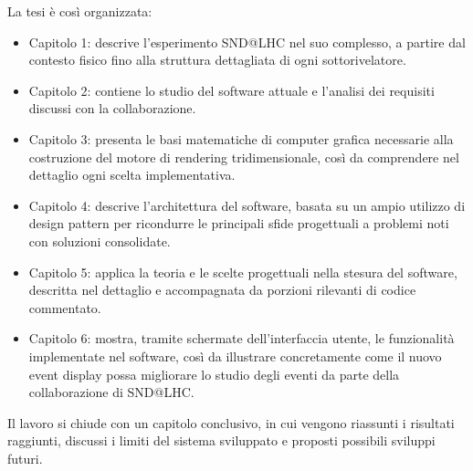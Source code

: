 La tesi è così organizzata:
\begin{itemize}
    \item Capitolo 1: descrive l'esperimento SND@LHC nel suo complesso, a partire dal contesto fisico fino alla struttura dettagliata di ogni sottorivelatore.
    \item Capitolo 2: contiene lo studio del software attuale e l'analisi dei requisiti discussi con la collaborazione.
    \item Capitolo 3: presenta le basi matematiche di computer grafica necessarie alla costruzione del motore di rendering tridimensionale, così da comprendere nel dettaglio ogni scelta implementativa.
    \item Capitolo 4: descrive l'architettura del software, basata su un ampio utilizzo di design pattern per ricondurre le principali sfide progettuali a problemi noti con soluzioni consolidate.
    \item Capitolo 5: applica la teoria e le scelte progettuali nella stesura del software, descritta nel dettaglio e accompagnata da porzioni rilevanti di codice commentato.
    \item Capitolo 6: mostra, tramite schermate dell'interfaccia utente, le funzionalità implementate nel software, così da illustrare concretamente come il nuovo event display possa migliorare lo studio degli eventi da parte della collaborazione di SND@LHC.
\end{itemize}
Il lavoro si chiude con un capitolo conclusivo, in cui vengono riassunti i risultati raggiunti, discussi i limiti del sistema sviluppato e proposti possibili sviluppi futuri.